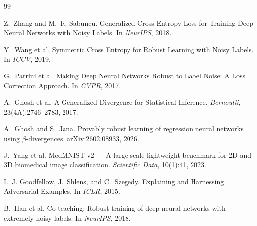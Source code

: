 \documentclass[11pt,a4paper]{article}
\begin{document}
\begin{thebibliography}{99}

Z.~Zhang and M.~R. Sabuncu.
\newblock Generalized Cross Entropy Loss for Training Deep Neural Networks with Noisy Labels.
\newblock In \emph{NeurIPS}, 2018.

Y.~Wang et al.
\newblock Symmetric Cross Entropy for Robust Learning with Noisy Labels.
\newblock In \emph{ICCV}, 2019.

G.~Patrini et al.
\newblock Making Deep Neural Networks Robust to Label Noise: A Loss Correction Approach.
\newblock In \emph{CVPR}, 2017.

A.~Ghosh et al.
\newblock A Generalized Divergence for Statistical Inference.
\newblock \emph{Bernoulli}, 23(4A):2746--2783, 2017.

A.~Ghosh and S.~Jana.
\newblock Provably robust learning of regression neural networks using $\beta$-divergences.
\newblock arXiv:2602.08933, 2026.

J.~Yang et al.
\newblock MedMNIST v2 --- A large-scale lightweight benchmark for 2D and 3D biomedical image classification.
\newblock \emph{Scientific Data}, 10(1):41, 2023.

I.~J. Goodfellow, J.~Shlens, and C.~Szegedy.
\newblock Explaining and Harnessing Adversarial Examples.
\newblock In \emph{ICLR}, 2015.

B.~Han et al.
\newblock Co-teaching: Robust training of deep neural networks with extremely noisy labels.
\newblock In \emph{NeurIPS}, 2018.

\end{thebibliography}
\end{document}
